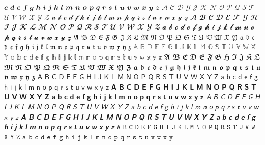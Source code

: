 $𝒄$ 
$𝒅$ 
$𝒆$ 
$𝒇$ 
$𝒈$ 
$𝒉$ 
$𝒊$ 
$𝒋$ 
$𝒌$ 
$𝒍$ 
$𝒎$ 
$𝒏$ 
$𝒐$ 
$𝒑$ 
$𝒒$ 
$𝒓$ 
$𝒔$ 
$𝒕$ 
$𝒖$ 
$𝒗$ 
$𝒘$ 
$𝒙$ 
$𝒚$ 
$𝒛$ 
$𝒜$ 
$𝒞$ 
$𝒟$ 
$𝒢$ 
$𝒥$ 
$𝒦$ 
$𝒩$ 
$𝒪$ 
$𝒫$ 
$𝒬$ 
$𝒮$ 
$𝒯$ 
$𝒰$ 
$𝒱$ 
$𝒲$ 
$𝒳$ 
$𝒴$ 
$𝒵$ 
$𝒶$ 
$𝒷$ 
$𝒸$ 
$𝒹$ 
$𝒻$ 
$𝒽$ 
$𝒾$ 
$𝒿$ 
$𝓀$ 
$𝓁$ 
$𝓂$ 
$𝓃$ 
$𝓅$ 
$𝓆$ 
$𝓇$ 
$𝓈$ 
$𝓉$ 
$𝓊$ 
$𝓋$ 
$𝓌$ 
$𝓍$ 
$𝓎$ 
$𝓏$ 
$𝓐$ 
$𝓑$ 
$𝓒$ 
$𝓓$ 
$𝓔$ 
$𝓕$ 
$𝓖$ 
$𝓗$ 
$𝓘$ 
$𝓙$ 
$𝓚$ 
$𝓛$ 
$𝓜$ 
$𝓝$ 
$𝓞$ 
$𝓟$ 
$𝓠$ 
$𝓡$ 
$𝓢$ 
$𝓣$ 
$𝓤$ 
$𝓥$ 
$𝓦$ 
$𝓧$ 
$𝓨$ 
$𝓩$ 
$𝓪$ 
$𝓫$ 
$𝓬$ 
$𝓭$ 
$𝓮$ 
$𝓯$ 
$𝓰$ 
$𝓱$ 
$𝓲$ 
$𝓳$ 
$𝓴$ 
$𝓵$ 
$𝓶$ 
$𝓷$ 
$𝓸$ 
$𝓹$ 
$𝓺$ 
$𝓻$ 
$𝓼$ 
$𝓽$ 
$𝓾$ 
$𝓿$ 
$𝔀$ 
$𝔁$ 
$𝔂$ 
$𝔃$ 
$𝔄$ 
$𝔅$ 
$𝔇$ 
$𝔈$ 
$𝔉$ 
$𝔊$ 
$𝔍$ 
$𝔎$ 
$𝔏$ 
$𝔐$ 
$𝔑$ 
$𝔒$ 
$𝔓$ 
$𝔔$ 
$𝔖$ 
$𝔗$ 
$𝔘$ 
$𝔙$ 
$𝔚$ 
$𝔛$ 
$𝔜$ 
$𝔞$ 
$𝔟$ 
$𝔠$ 
$𝔡$ 
$𝔢$ 
$𝔣$ 
$𝔤$ 
$𝔥$ 
$𝔦$ 
$𝔧$ 
$𝔨$ 
$𝔩$ 
$𝔪$ 
$𝔫$ 
$𝔬$ 
$𝔭$ 
$𝔮$ 
$𝔯$ 
$𝔰$ 
$𝔱$ 
$𝔲$ 
$𝔳$ 
$𝔴$ 
$𝔵$ 
$𝔶$ 
$𝔷$ 
$𝔸$ 
$𝔹$ 
$𝔻$ 
$𝔼$ 
$𝔽$ 
$𝔾$ 
$𝕀$ 
$𝕁$ 
$𝕂$ 
$𝕃$ 
$𝕄$ 
$𝕆$ 
$𝕊$ 
$𝕋$ 
$𝕌$ 
$𝕍$ 
$𝕎$ 
$𝕏$ 
$𝕐$ 
$𝕒$ 
$𝕓$ 
$𝕔$ 
$𝕕$ 
$𝕖$ 
$𝕗$ 
$𝕘$ 
$𝕙$ 
$𝕚$ 
$𝕛$ 
$𝕜$ 
$𝕝$ 
$𝕞$ 
$𝕟$ 
$𝕠$ 
$𝕡$ 
$𝕢$ 
$𝕣$ 
$𝕤$ 
$𝕥$ 
$𝕦$ 
$𝕧$ 
$𝕨$ 
$𝕩$ 
$𝕪$ 
$𝕫$ 
$𝕬$ 
$𝕭$ 
$𝕮$ 
$𝕯$ 
$𝕰$ 
$𝕱$ 
$𝕲$ 
$𝕳$ 
$𝕴$ 
$𝕵$ 
$𝕶$ 
$𝕷$ 
$𝕸$ 
$𝕹$ 
$𝕺$ 
$𝕻$ 
$𝕼$ 
$𝕽$ 
$𝕾$ 
$𝕿$ 
$𝖀$ 
$𝖁$ 
$𝖂$ 
$𝖃$ 
$𝖄$ 
$𝖅$ 
$𝖆$ 
$𝖇$ 
$𝖈$ 
$𝖉$ 
$𝖊$ 
$𝖋$ 
$𝖌$ 
$𝖍$ 
$𝖎$ 
$𝖏$ 
$𝖐$ 
$𝖑$ 
$𝖒$ 
$𝖓$ 
$𝖔$ 
$𝖕$ 
$𝖖$ 
$𝖗$ 
$𝖘$ 
$𝖙$ 
$𝖚$ 
$𝖛$ 
$𝖜$ 
$𝖝$ 
$𝖞$ 
$𝖟$ 
$𝖠$ 
$𝖡$ 
$𝖢$ 
$𝖣$ 
$𝖤$ 
$𝖥$ 
$𝖦$ 
$𝖧$ 
$𝖨$ 
$𝖩$ 
$𝖪$ 
$𝖫$ 
$𝖬$ 
$𝖭$ 
$𝖮$ 
$𝖯$ 
$𝖰$ 
$𝖱$ 
$𝖲$ 
$𝖳$ 
$𝖴$ 
$𝖵$ 
$𝖶$ 
$𝖷$ 
$𝖸$ 
$𝖹$ 
$𝖺$ 
$𝖻$ 
$𝖼$ 
$𝖽$ 
$𝖾$ 
$𝖿$ 
$𝗀$ 
$𝗁$ 
$𝗂$ 
$𝗃$ 
$𝗄$ 
$𝗅$ 
$𝗆$ 
$𝗇$ 
$𝗈$ 
$𝗉$ 
$𝗊$ 
$𝗋$ 
$𝗌$ 
$𝗍$ 
$𝗎$ 
$𝗏$ 
$𝗐$ 
$𝗑$ 
$𝗒$ 
$𝗓$ 
$𝗔$ 
$𝗕$ 
$𝗖$ 
$𝗗$ 
$𝗘$ 
$𝗙$ 
$𝗚$ 
$𝗛$ 
$𝗜$ 
$𝗝$ 
$𝗞$ 
$𝗟$ 
$𝗠$ 
$𝗡$ 
$𝗢$ 
$𝗣$ 
$𝗤$ 
$𝗥$ 
$𝗦$ 
$𝗧$ 
$𝗨$ 
$𝗩$ 
$𝗪$ 
$𝗫$ 
$𝗬$ 
$𝗭$ 
$𝗮$ 
$𝗯$ 
$𝗰$ 
$𝗱$ 
$𝗲$ 
$𝗳$ 
$𝗴$ 
$𝗵$ 
$𝗶$ 
$𝗷$ 
$𝗸$ 
$𝗹$ 
$𝗺$ 
$𝗻$ 
$𝗼$ 
$𝗽$ 
$𝗾$ 
$𝗿$ 
$𝘀$ 
$𝘁$ 
$𝘂$ 
$𝘃$ 
$𝘄$ 
$𝘅$ 
$𝘆$ 
$𝘇$ 
$𝘈$ 
$𝘉$ 
$𝘊$ 
$𝘋$ 
$𝘌$ 
$𝘍$ 
$𝘎$ 
$𝘏$ 
$𝘐$ 
$𝘑$ 
$𝘒$ 
$𝘓$ 
$𝘔$ 
$𝘕$ 
$𝘖$ 
$𝘗$ 
$𝘘$ 
$𝘙$ 
$𝘚$ 
$𝘛$ 
$𝘜$ 
$𝘝$ 
$𝘞$ 
$𝘟$ 
$𝘠$ 
$𝘡$ 
$𝘢$ 
$𝘣$ 
$𝘤$ 
$𝘥$ 
$𝘦$ 
$𝘧$ 
$𝘨$ 
$𝘩$ 
$𝘪$ 
$𝘫$ 
$𝘬$ 
$𝘭$ 
$𝘮$ 
$𝘯$ 
$𝘰$ 
$𝘱$ 
$𝘲$ 
$𝘳$ 
$𝘴$ 
$𝘵$ 
$𝘶$ 
$𝘷$ 
$𝘸$ 
$𝘹$ 
$𝘺$ 
$𝘻$ 
$𝘼$ 
$𝘽$ 
$𝘾$ 
$𝘿$ 
$𝙀$ 
$𝙁$ 
$𝙂$ 
$𝙃$ 
$𝙄$ 
$𝙅$ 
$𝙆$ 
$𝙇$ 
$𝙈$ 
$𝙉$ 
$𝙊$ 
$𝙋$ 
$𝙌$ 
$𝙍$ 
$𝙎$ 
$𝙏$ 
$𝙐$ 
$𝙑$ 
$𝙒$ 
$𝙓$ 
$𝙔$ 
$𝙕$ 
$𝙖$ 
$𝙗$ 
$𝙘$ 
$𝙙$ 
$𝙚$ 
$𝙛$ 
$𝙜$ 
$𝙝$ 
$𝙞$ 
$𝙟$ 
$𝙠$ 
$𝙡$ 
$𝙢$ 
$𝙣$ 
$𝙤$ 
$𝙥$ 
$𝙦$ 
$𝙧$ 
$𝙨$ 
$𝙩$ 
$𝙪$ 
$𝙫$ 
$𝙬$ 
$𝙭$ 
$𝙮$ 
$𝙯$ 
$𝙰$ 
$𝙱$ 
$𝙲$ 
$𝙳$ 
$𝙴$ 
$𝙵$ 
$𝙶$ 
$𝙷$ 
$𝙸$ 
$𝙹$ 
$𝙺$ 
$𝙻$ 
$𝙼$ 
$𝙽$ 
$𝙾$ 
$𝙿$ 
$𝚀$ 
$𝚁$ 
$𝚂$ 
$𝚃$ 
$𝚄$ 
$𝚅$ 
$𝚆$ 
$𝚇$ 
$𝚈$ 
$𝚉$ 
$𝚊$ 
$𝚋$ 
$𝚌$ 
$𝚍$ 
$𝚎$ 
$𝚏$ 
$𝚐$ 
$𝚑$ 
$𝚒$ 
$𝚓$ 
$𝚔$ 
$𝚕$ 
$𝚖$ 
$𝚗$ 
$𝚘$ 
$𝚙$ 
$𝚚$ 
$𝚛$ 
$𝚜$ 
$𝚝$ 
$𝚞$ 
$𝚟$ 
$𝚠$ 
$𝚡$ 
$𝚢$ 
